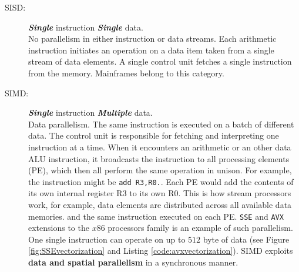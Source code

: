 \begin{description}
\item[SISD:] \textit{\textbf{Single}} instruction \textit{\textbf{Single}}
data.\hfill\\
No parallelism in either instruction or data streams.
Each arithmetic instruction initiates an operation on a data item taken from a single stream of data elements.
A single control unit fetches a single instruction from the memory.
Mainframes belong to this category.
\item[SIMD:] \textit{\textbf{Single}} instruction \textit{\textbf{Multiple}} data. \hfill \\ 
Data parallelism. The same instruction is executed on a batch of different data.
The control unit is responsible for fetching and interpreting one instruction at a time.
When it encounters an arithmetic or an other data ALU instruction, it broadcasts the instruction
to all processing elements (PE), which then all perform the same operation in unison.
For example, the instruction might be \texttt{add R3,R0.}.
Each PE would add the contents of its own internal register R3 to its own R0.
This is how stream processors work, for example, data elements are distributed across all available data memories. and the same instruction executed on each PE.
\texttt{SSE} and \texttt{AVX} extensions to the $x86$ processors family is an example of such parallelism.
One single instruction can operate on up to $512$ byte of data (see Figure \ref{fig:SSEvectorization} and Listing \ref{code:avxvectorization}).
SIMD exploits \textbf{data and spatial parallelism} in a synchronous manner.
\end{description}
